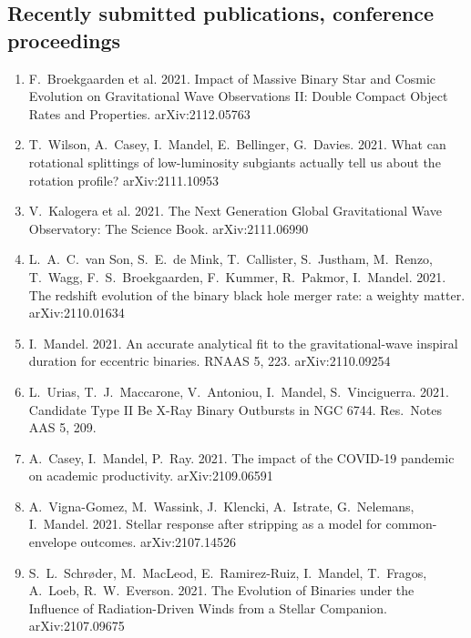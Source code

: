 \documentclass[margin,line]{res}
\begin{document}
\begin{resume}
\section{\sc Recently submitted publications, conference proceedings}

\begin{enumerate}

\item F.~Broekgaarden et al.  2021.  Impact of Massive Binary Star and Cosmic Evolution on Gravitational Wave Observations II: Double Compact Object Rates and Properties.  arXiv:2112.05763

\item T.~Wilson, A.~Casey, I.~Mandel, E.~Bellinger, G.~Davies.  2021.  What can rotational splittings of low-luminosity subgiants actually tell us about the rotation profile?  arXiv:2111.10953

\item V.~Kalogera et al.  2021. The Next Generation Global Gravitational Wave Observatory: The Science Book.  arXiv:2111.06990

\item L.~A.~C.~van Son, S.~E.~de Mink, T.~Callister, S.~Justham, M.~Renzo, T.~Wagg, F.~S.~Broekgaarden, F.~Kummer, R.~Pakmor, I.~Mandel.  2021.  The redshift evolution of the binary black hole merger rate: a weighty matter.  arXiv:2110.01634 

\item I.~Mandel.  2021.  An accurate analytical fit to the gravitational-wave inspiral duration for eccentric binaries. RNAAS 5, 223. arXiv:2110.09254

\item L.~Urias, T.~J.~Maccarone, V.~Antoniou, I.~Mandel, S.~Vinciguerra.  2021.  Candidate Type II Be X-Ray Binary Outbursts in NGC 6744.  Res.~Notes AAS 5, 209.

\item A.~Casey, I.~Mandel, P.~Ray. 2021. The impact of the COVID-19 pandemic on academic productivity.  arXiv:2109.06591

\item A.~Vigna-Gomez, M.~Wassink, J.~Klencki, A.~Istrate, G.~Nelemans, I.~Mandel.  2021. Stellar response after stripping as a model for common-envelope outcomes. arXiv:2107.14526

\item S.~L.~Schr{\o}der, M.~MacLeod, E.~Ramirez-Ruiz, I.~Mandel, T.~Fragos, A.~Loeb, R.~W.~Everson. 2021. The Evolution of Binaries under the Influence of Radiation-Driven Winds
  from a Stellar Companion.  arXiv:2107.09675


\end{enumerate}
\end{resume}
\end{document}
